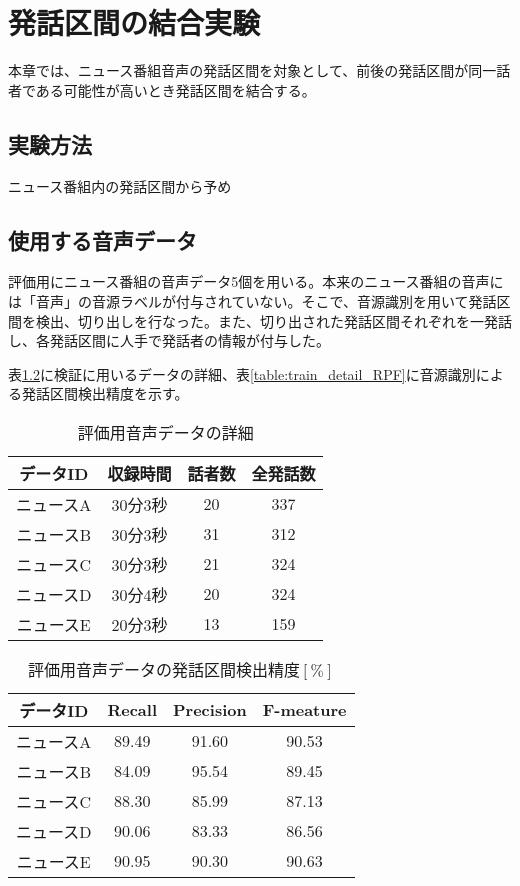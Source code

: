 \chapter{発話区間の結合実験}
本章では、ニュース番組音声の発話区間を対象として、前後の発話区間が同一話者である可能性が高いとき発話区間を結合する。
\section{実験方法}
ニュース番組内の発話区間から予め
\section{使用する音声データ}
\par
評価用にニュース番組の音声データ5個を用いる。本来のニュース番組の音声には「音声」の音源ラベルが付与されていない。そこで、音源識別を用いて発話区間を検出、切り出しを行なった。また、切り出された発話区間それぞれを一発話し、各発話区間に人手で発話者の情報が付与した。\par
表\ref{table:test_detail}に検証に用いるデータの詳細、表\ref{table:train_detail_RPF}に音源識別による発話区間検出精度を示す。

\begin{table}[htb]
  \begin{center}
  \label{table:test_detail}
    \caption{評価用音声データの詳細}
    \begin{tabular}{|c||c|c|c|} \hline
      データID & 収録時間 & 話者数 & 全発話数 \\ \hline
      ニュースA & 30分3秒 & 20 & 337 \\ \hline
      ニュースB & 30分3秒 & 31 & 312\\ \hline
      ニュースC & 30分3秒 & 21 & 324 \\ \hline
      ニュースD & 30分4秒 & 20 & 324\\ \hline
      ニュースE & 20分3秒 & 13 & 159\\ \hline
    \end{tabular}
  \end{center}
\end{table}

\begin{table}[htb]
  \begin{center}
  \label{table:test_detail}
    \caption{評価用音声データの発話区間検出精度$[\%]$}
    \begin{tabular}{|c||c|c|c|} \hline
      データID & Recall & Precision & F-meature \\ \hline
      ニュースA & 89.49 & 91.60 & 90.53 \\ \hline
      ニュースB & 84.09 & 95.54 & 89.45\\ \hline
      ニュースC & 88.30 & 85.99 & 87.13 \\ \hline
      ニュースD & 90.06 & 83.33 & 86.56\\ \hline
      ニュースE & 90.95 & 90.30 & 90.63\\ \hline
    \end{tabular}
  \end{center}
\end{table}

